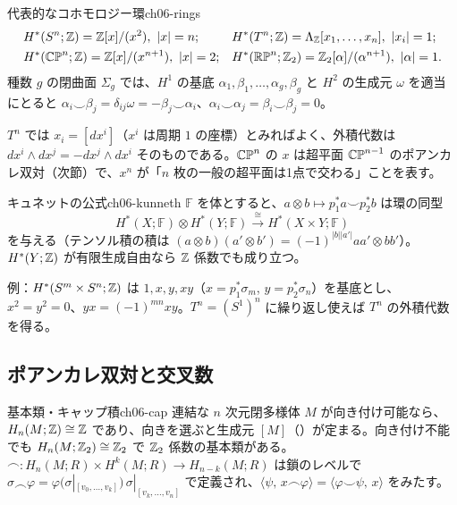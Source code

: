 \begin{mythm}{代表的なコホモロジー環}{ch06-rings}
\begin{align*}
&H^*(S^n;\Z)=\Z[x]/(x^2),\ \lvert x\rvert=n; &&H^*(T^n;\Z)=\Lambda_\Z[x_1,\dots,x_n],\ \lvert x_i\rvert=1;\\
&H^*(\CP^n;\Z)=\Z[x]/(x^{n+1}),\ \lvert x\rvert=2; &&H^*(\RP^n;\Z_2)=\Z_2[\alpha]/(\alpha^{n+1}),\ \lvert\alpha\rvert=1.
\end{align*}
種数 $g$ の閉曲面 $\Sigma_g$ では、$H^1$ の基底 $\alpha_1,\beta_1,\dots,\alpha_g,\beta_g$ と $H^2$ の生成元 $\omega$ を適当にとると $\alpha_i\smile\beta_j=\delta_{ij}\omega=-\beta_j\smile\alpha_i$、$\alpha_i\smile\alpha_j=\beta_i\smile\beta_j=0$。
\end{mythm}
$T^n$ では $x_i=[dx^i]$（$x^i$ は周期 $1$ の座標）とみればよく、外積代数は $dx^i\wedge dx^j=-dx^j\wedge dx^i$ そのものである。$\mathbb{CP}^n$ の $x$ は超平面 $\mathbb{CP}^{n-1}$ のポアンカレ双対（次節）で、$x^n$ が「$n$ 枚の一般の超平面は1点で交わる」ことを表す。

\begin{mythm}{キュネットの公式}{ch06-kunneth}
$\mathbb F$ を体とすると、$a\otimes b\mapsto p_1^*a\smile p_2^*b$ は環の同型
\[
H^*(X;\mathbb F)\otimes H^*(Y;\mathbb F)\xrightarrow{\ \cong\ }H^*(X\times Y;\mathbb F)
\]
を与える（テンソル積の積は $(a\otimes b)(a'\otimes b')=(-1)^{\lvert b\rvert\lvert a'\rvert}aa'\otimes bb'$）。$H^*(Y;\mathbb{Z})$ が有限生成自由なら $\mathbb{Z}$ 係数でも成り立つ。
\end{mythm}
例：$H^*(S^m\times S^n;\mathbb{Z})$ は $1,x,y,xy$（$x=p_1^*\sigma_m$, $y=p_2^*\sigma_n$）を基底とし、$x^2=y^2=0$、$yx=(-1)^{mn}xy$。$T^n=(S^1)^n$ に繰り返し使えば $T^n$ の外積代数を得る。

\subsection{ポアンカレ双対と交叉数}

\begin{mydef}{基本類・キャップ積}{ch06-cap}
連結な $n$ 次元閉多様体 $M$ が向き付け可能なら、$H_n(M;\mathbb{Z})\cong\mathbb{Z}$ であり、向きを選ぶと生成元 $[M]$（）が定まる。向き付け不能でも $H_n(M;\mathbb{Z}_2)\cong\mathbb{Z}_2$ で $\mathbb{Z}_2$ 係数の基本類がある。 $\frown\colon H_n(M;R)\times H^k(M;R)\to H_{n-k}(M;R)$ は鎖のレベルで $\sigma\frown\varphi=\varphi(\sigma|_{[v_0,\dots,v_k]})\,\sigma|_{[v_k,\dots,v_n]}$ で定義され、$\langle\psi,\,x\frown\varphi\rangle=\langle\varphi\smile\psi,\,x\rangle$ をみたす。
\end{mydef}

